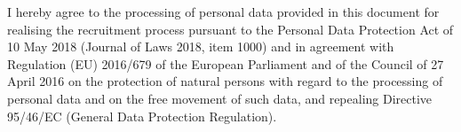\documentclass[9pt]{style/developercv}
\begin{document}
\vspace{3.00cm}

\begin{minipage}[t]{1\textwidth}
	I hereby agree to the processing of personal data provided in this document for 
	realising the recruitment process pursuant to the Personal Data Protection Act
	of 10 May 2018 (Journal of Laws 2018, item 1000) and in agreement with Regulation (EU) 
	2016/679 of the European Parliament and of the Council of 27 April 2016 on the 
	protection of natural persons with regard to the processing of personal data and on 
	the free movement of such data, and repealing Directive 95/46/EC (General Data 
	Protection Regulation).
\end{minipage}
\end{document}
